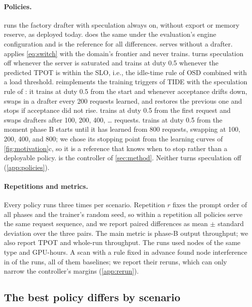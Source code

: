 \paragraph{Policies.}  runs the factory drafter with speculation always on, without export or memory reserve, as deployed today.  does the same under the evaluation's engine configuration and is the reference for all differences.  serves without a drafter.  applies \cref{eq:switch} with the domain's frontier and never trains.  turns speculation off whenever the server is saturated and trains at duty 0.5 whenever the predicted TPOT is within the SLO, i.e., the idle-time rule of OSD \citep{liu2024osd} combined with a load threshold.  reimplements the training triggers of TIDE \citep{park2026tide} with the speculation rule of : it trains at duty 0.5 from the start and whenever acceptance drifts down, swaps in a drafter every 200 requests learned, and restores the previous one and stops if acceptance did not rise.  trains at duty 0.5 from the first request and swaps drafters after 100, 200, 400, \dots{} requests.  trains at duty 0.5 from the moment phase B starts until it has learned from 800 requests, swapping at 100, 200, 400, and 800; we chose its stopping point from the learning curves of \cref{fig:motivation}c, so it is a reference that knows when to stop rather than a deployable policy.  is the controller of \cref{sec:method}. Neither turns speculation off (\cref{app:policies}).

\paragraph{Repetitions and metrics.} Every policy runs three times per scenario. Repetition $r$ fixes the prompt order of all phases and the trainer's random seed, so within a repetition all policies serve the same request sequence, and we report paired differences as mean $\pm$ standard deviation over the three pairs. The main metric is phase-B output throughput; we also report TPOT and whole-run throughput. The  runs used  nodes of the same type and  GPU-hours. A scan with a rule fixed in advance found node interference in  of the  runs, all of them baselines; we report their reruns, which can only narrow the controller's margins (\cref{app:rerun}).

\subsection{The best policy differs by scenario}\label{sec:results}

